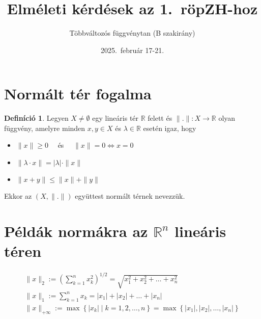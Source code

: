 \documentclass{article}
\title{Elméleti kérdések az 1.\ röpZH-hoz}
\author{Többváltozós függvénytan (B szakirány)}
\date{2025.\ február 17-21.}
\theoremstyle{definition}
\newtheorem*{definition*}{Definíció}
\begin{document}
\maketitle
\tableofcontents
\goodbreak
\section{Normált tér fogalma}
\begin{definition*}
	Legyen $X \neq \emptyset$ egy lineáris tér $\mathbb{R}$ felett és
	$\| . \|: X \to \mathbb{R}$ olyan függvény,
	amelyre minden $x, y \in X$ és $\lambda \in \mathbb{R}$ esetén igaz, hogy
	\begin{itemize}
		\item $\| x \| \geq 0 \quad$ és $\quad \| x \| = 0 \iff x = 0$
		\item $\| \lambda \cdot x \| = |\lambda| \cdot \| x \|$
		\item $\| x + y \| \leq \| x \| + \| y \|$
	\end{itemize}
	Ekkor az $(X, \| . \|)$ együttest normált térnek nevezzük.
\end{definition*}
\goodbreak
\section{Példák normákra az $\mathbb{R}^n$ lineáris téren}
\begin{gather*}
	\| x \|_2 := \left( \sum_{k = 1}^n x_k^2 \right)^{1 / 2} =
	\sqrt{x_1^2 + x_2^2 + \dots + x_n^2} \\
	\| x \|_1 := \sum_{k = 1}^n x_k = |x_1| + |x_2| + \dots + |x_n| \\
	\| x \|_{+\infty} := \max\left\{ |x_k| \mid k = 1, 2, \dots, n \right\} =
	\max\left\{ |x_1|, |x_2|, \dots, |x_n|  \right\}
\end{gather*}
\end{document}
